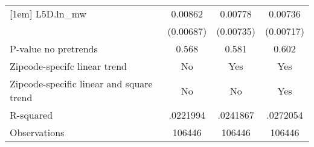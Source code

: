 {\begin{tabular}{l*{3}{c}}
[1em]
L5D.ln\_mw &  0.00862         &  0.00778         &  0.00736         \\
          &(0.00687)         &(0.00735)         &(0.00717)         \\
\hline
P-value no pretrends&    0.568         &    0.581         &    0.602         \\
Zipcode-specifc linear trend&       No         &      Yes         &      Yes         \\
Zipcode-specific linear and square trend&       No         &       No         &      Yes         \\
R-squared & .0221994         & .0241867         & .0272054         \\
Observations&   106446         &   106446         &   106446         \\
\hline\hline
\end{tabular}
}
